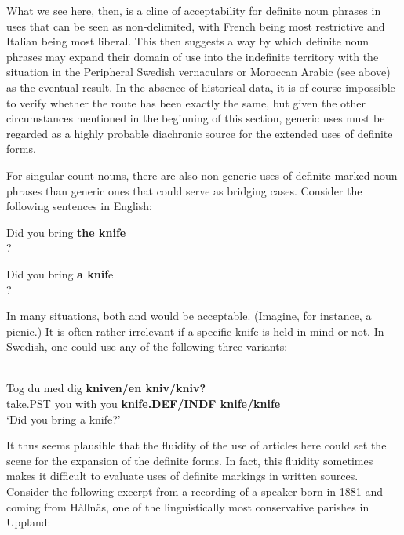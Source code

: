 What we see here, then, is a cline of acceptability for definite noun phrases in uses that can be seen as non-delimited, with French being most restrictive and Italian being most liberal. This then suggests a way by which definite noun phrases may expand their domain of use into the indefinite territory with the situation in the Peripheral Swedish vernaculars or Moroccan Arabic (see  above) as the eventual result. In the absence of historical data, it is of course impossible to verify whether the route has been exactly the same, but given the other circumstances mentioned in the beginning of this section, generic uses must be regarded as a highly probable diachronic source for the extended uses of definite forms. 

For singular count nouns, there are also non-generic uses of definite-marked noun phrases than generic ones that could serve as bridging cases. Consider the following sentences in English:

\ea
\gl \label{bkm:Ref123724733}Did you bring \textbf{the knife}\\?
\z 

\ea 
\gl \label{bkm:Ref123724734}Did you bring \textbf{a knif}e\\?
\z 

In many situations, both  and  would be acceptable. (Imagine, for instance, a picnic.) It is often rather irrelevant if a specific knife is held in mind or not. In Swedish, one could use any of the following three variants:

\ea \label{} 
\\
\gll Tog  du  med  dig  \textbf{kniven/en kniv/kniv?}\\
take.PST  you  with  you  \textbf{knife.DEF/INDF knife/knife}\\
\glt ‘Did you bring a knife?’

\z

It thus seems plausible that the fluidity of the use of articles here could set the scene for the expansion of the definite forms. In fact, this fluidity sometimes makes it difficult to evaluate uses of definite markings in written sources. Consider the following excerpt from a recording of a speaker born in 1881 and coming from Hållnäs, one of the linguistically most conservative parishes in Uppland:

